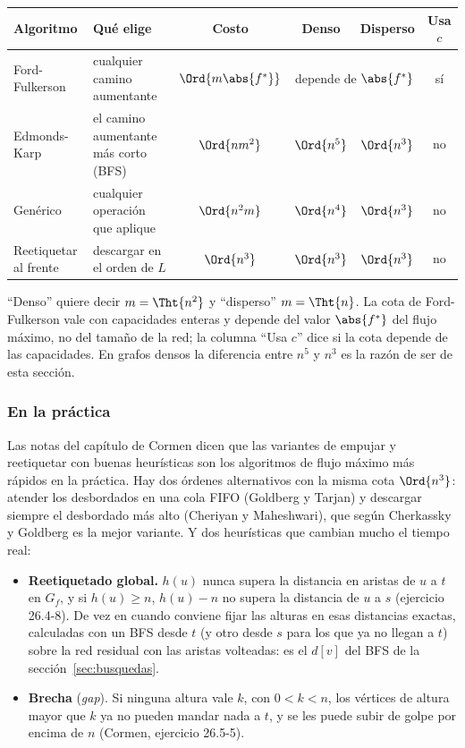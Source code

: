 \documentclass[11pt,letterpaper]{article}
\begin{document}
\begin{center}
\small
\begin{tabular}{l>{\raggedright\arraybackslash}p{3.4cm}cccc}
  \toprule
  \textbf{Algoritmo} & \textbf{Qué elige} & \textbf{Costo}
    & \textbf{Denso} & \textbf{Disperso} & \textbf{Usa $c$} \\
  \midrule
  Ford-Fulkerson & cualquier camino aumentante
    & $\Ord{m \abs{f^*}}$ & \multicolumn{2}{c}{depende de $\abs{f^*}$}
    & sí \\
  \addlinespace
  Edmonds-Karp & el camino aumentante más corto (BFS)
    & $\Ord{n m^2}$ & $\Ord{n^5}$ & $\Ord{n^3}$ & no \\
  \addlinespace
  Genérico & cualquier operación que aplique
    & $\Ord{n^2 m}$ & $\Ord{n^4}$ & $\Ord{n^3}$ & no \\
  \addlinespace
  Reetiquetar al frente & descargar en el orden de $L$
    & $\Ord{n^3}$ & $\Ord{n^3}$ & $\Ord{n^3}$ & no \\
  \bottomrule
\end{tabular}
\end{center}

``Denso'' quiere decir $m = \Tht{n^2}$ y ``disperso'' $m = \Tht{n}$.
La cota de Ford-Fulkerson vale con capacidades enteras y depende del
valor $\abs{f^*}$ del flujo máximo, no del tamaño de la red; la
columna ``Usa $c$'' dice si la cota depende de las capacidades. En
grafos densos la diferencia entre $n^5$ y $n^3$ es la razón de ser de
esta sección.

\subsubsection*{En la práctica}

Las notas del capítulo de Cormen dicen que las variantes de empujar y
reetiquetar con buenas heurísticas son los algoritmos de flujo máximo
más rápidos en la práctica. Hay dos órdenes alternativos con la misma
cota $\Ord{n^3}$: atender los desbordados en una cola FIFO (Goldberg y
Tarjan) y descargar siempre el desbordado más alto (Cheriyan y
Maheshwari), que según Cherkassky y Goldberg es la mejor variante. Y
dos heurísticas que cambian mucho el tiempo real:
\begin{itemize}
  \item \textbf{Reetiquetado global.} $h(u)$ nunca supera la distancia
        en aristas de $u$ a $t$ en $G_f$, y si $h(u) \ge n$, $h(u) - n$
        no supera la distancia de $u$ a $s$ (ejercicio 26.4-8). De vez
        en cuando conviene fijar las alturas en esas distancias exactas,
        calculadas con un BFS desde $t$ (y otro desde $s$ para los que
        ya no llegan a $t$) sobre la red residual con las aristas
        volteadas: es el $d[v]$ del BFS de la
        sección~\ref{sec:busquedas}.
  \item \textbf{Brecha} (\textit{gap}). Si ninguna altura vale $k$, con
        $0 < k < n$, los vértices de altura mayor que $k$ ya no pueden
        mandar nada a $t$, y se les puede subir de golpe por encima de
        $n$ (Cormen, ejercicio 26.5-5).
\end{itemize}
\end{document}
